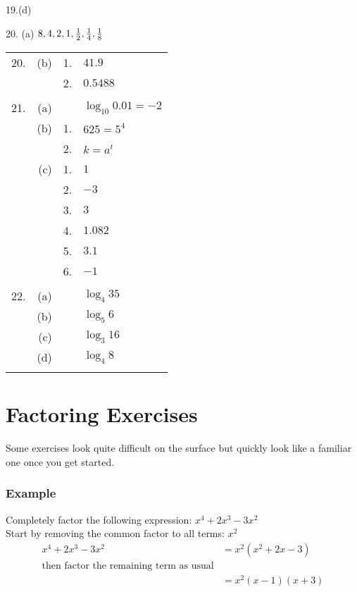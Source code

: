 19.(d)    
\setlength\fboxrule{0.01in}\setlength\fboxsep{0.2in}


20. (a) $8 ,4 ,2 ,1 ,\frac{1}{2} ,\frac{1}{4} ,\frac{1}{8}\vspace{+0.500000cm}$ \\\relax    
\setlength\fboxrule{0.01in}\setlength\fboxsep{0.2in}



\begin{tabular}[c]{rrrl}20.  & (b)
	& 1.  & $41.9$  \\
	&  & 2.
	& $0.5488$  \\
	&  &  &  \\
	21.
	& (a)  &  & $\log _{10} 0.01 = -2$  \\
	& (b)  & 1.
	& $625 =5^{4}$  \\
	&  & 2.
	& $k =a^{t}$  \\
	& (c)  & 1.
	& $1$  \\
	&  & 2.
	& $ -3$  \\
	&  & 3.
	& $3$  \\
	&  & 4.
	& $1.082$  \\
	&  & 5.
	& $3.1$  \\
	&  & 6.
	& $ -1$  \\
	&  &  &  \\
	22.
	& (a)  &  & $\log _{4} 35$  \\
	& (b)  &  & $\log _{5} 6$  \\
	& (c)  &  & $\log _{3} 16$  \\
	& (d)  &  & $\log _{4} 8$  \\
	&  &  &  \\

\end{tabular} 
\clearpage
\section*{Factoring Exercises}
Some exercises look quite difficult on the surface but quickly look like a
familiar one once you get started. 

\subsubsection{Example}
Completely factor the following expression: $x^{4} +2 x^{3} -3 x^{2}$\\
Start by removing the common factor to all terms: $x^2$\\
\begin{eqnarray*} x^{4} +2 x^{3} -3 x^{2} &= x^{2} \left (x^{2} +2 x -3\right ) \\
	\text{then factor the remaining term as usual}\\
	 &= x^{2} \left (x -1\right ) \left (x +3\right )\end{eqnarray*}


